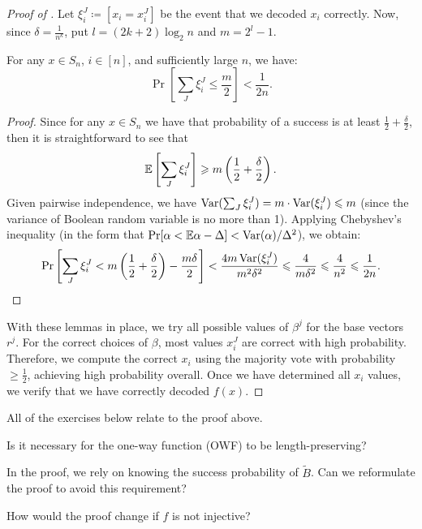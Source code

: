 \begin{proof}[Proof of ]
	Let $\xi_i^J \coloneqq [x_i = x_i^J]$ be the event that we decoded $x_i$ correctly.
	Now, since $\delta = \frac{1}{n^{k}}$, put $l = (2k + 2) \log_2 n$ and $m = 2^{l} - 1$.

	\begin{lemma}
	   For any $x \in S_n$, $i \in [n]$, and sufficiently large $n$, we have:
		\[
			\Pr\left[\sum_J \xi_i^J \leq \frac{m}{2}\right] < \frac{1}{2n}.
		\] 
	\end{lemma}

	\begin{proof}
		Since for any $x \in  S_n$ we have that probability of a success is at least $\frac{1}{2} + \frac{\delta}{2}$, then it is straightforward to see that
		\[
			\mathbb{E}\left[\sum_J \xi_i^J\right] \geqslant m\left(\frac{1}{2} + \frac{\delta}{2}\right).
		\]
		Given pairwise independence, we have $\operatorname{Var}(\sum_J \xi_i^J) = m \cdot \operatorname{Var}(\xi_i^J) \leqslant m$ (since the variance of Boolean random variable is no more than 1).
		Applying Chebyshev's inequality (in the form that $\Pr[\alpha < \mathbb{E} \alpha - \Delta] < \operatorname{Var}(\alpha) / \Delta^2$), we obtain:
		\[
			\Pr\left[\sum_J \xi_i^J < m\left(\frac{1}{2} + \frac{\delta}{2}\right) - \frac{m\delta}{2}\right] < \frac{4m \operatorname{Var}(\xi_i^J)}{m^2 \delta^2} \leqslant \frac{4}{m \delta^2} \leqslant \frac{4}{n^2} \leqslant \frac{1}{2n}.
		\] 
	\end{proof}

	With these lemmas in place, we try all possible values of $\beta^j$ for the base vectors $r^j$.
	For the correct choices of $\beta$, most values $x_i^J$ are correct with high probability.
	Therefore, we compute the correct $x_i$ using the majority vote with probability $\geq \frac{1}{2}$, achieving high probability overall.
	Once we have determined all $x_i$ values, we verify that we have correctly decoded $f(x)$.
\end{proof}

All of the exercises below relate to the proof above.

\begin{exercise}
    Is it necessary for the one-way function (OWF) to be length-preserving?
\end{exercise}

\begin{exercise}
    In the proof, we rely on knowing the success probability of $\tilde{B}$.
    Can we reformulate the proof to avoid this requirement?
\end{exercise}

\begin{exercise}
    How would the proof change if $f$ is not injective?
\end{exercise}


